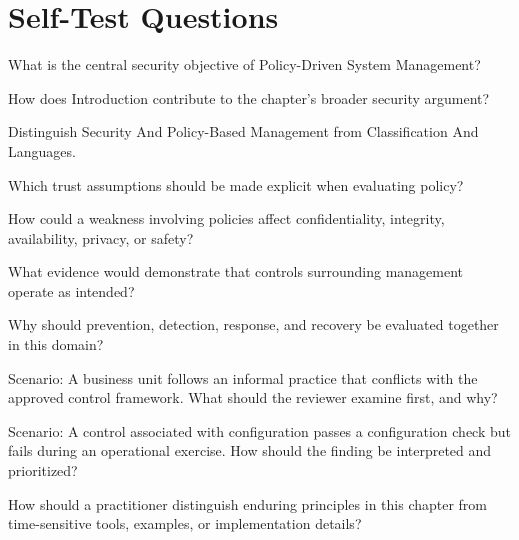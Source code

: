 \documentclass[11pt,letterpaper]{article}
\begin{document}
\section*{Self-Test Questions}
\begin{CornellRecallList}
\item What is the central security objective of Policy-Driven System Management?
\item How does Introduction contribute to the chapter's broader security argument?
\item Distinguish Security And Policy-Based Management from Classification And Languages.
\item Which trust assumptions should be made explicit when evaluating policy?
\item How could a weakness involving policies affect confidentiality, integrity, availability, privacy, or safety?
\item What evidence would demonstrate that controls surrounding management operate as intended?
\item Why should prevention, detection, response, and recovery be evaluated together in this domain?
\item Scenario: A business unit follows an informal practice that conflicts with the approved control framework. What should the reviewer examine first, and why?
\item Scenario: A control associated with configuration passes a configuration check but fails during an operational exercise. How should the finding be interpreted and prioritized?
\item How should a practitioner distinguish enduring principles in this chapter from time-sensitive tools, examples, or implementation details?
\end{CornellRecallList}
\end{document}
